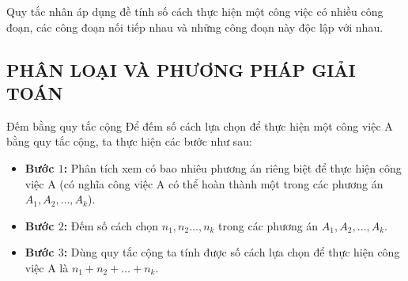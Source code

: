 \begin{note}
Quy tắc nhân áp dụng đề tính số cách thực hiện một công việc có nhiều công đoạn, các công đoạn nối tiếp nhau và những công đoạn này độc lập với nhau. 
\end{note}
\subsection{PHÂN LOẠI VÀ PHƯƠNG PHÁP GIẢI TOÁN}
\begin{dang}{Đếm bằng quy tắc cộng}
Để đếm số cách lựa chọn để thực hiện một công việc A bằng quy tắc cộng, ta thực hiện các bước như sau:
\begin{itemize}
	\item \textbf{Bước $1$:} Phân tích xem có bao nhiêu phương án riêng biệt để thực hiện công việc A (có nghĩa công việc A có thể hoàn thành một trong các phương án $A_1,A_2,\ldots,A_k$).
		\item \textbf{Bước $2$:} Đếm số cách chọn $n_1,n_2\ldots,n_k$ trong các phương án $A_1,A_2,\ldots,A_k$.
		\item \textbf{Bước $3$:} Dùng quy tắc cộng ta tính được số cách lựa chọn để thực hiện công việc A là $n_1+n_2+\ldots+n_k$.
	 
\end{itemize}

\end{dang}


